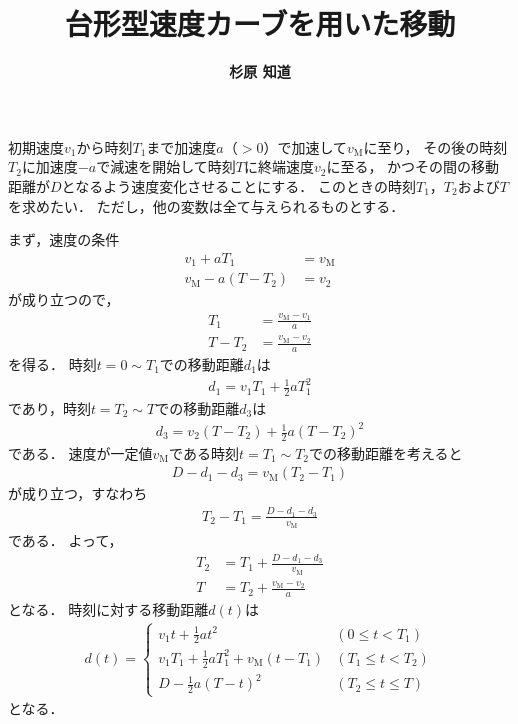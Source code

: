 ﻿\documentclass[a4paper]{jsarticle}
\title{\bf 台形型速度カーブを用いた移動}
\author{\Large{\bf 杉原 知道}}
\date{}
\begin{document}
\maketitle
\vspace{-\baselineskip}

\begin{figure}[th]
\begin{center}

\end{center}
\end{figure}

初期速度$v_{1}$から時刻$T_{1}$まで加速度$a$（$>0$）で加速して$v_{\mathrm{M}}$に至り，
その後の時刻$T_{2}$に加速度$-a$で減速を開始して時刻$T$に終端速度$v_{2}$に至る，
かつその間の移動距離が$D$となるよう速度変化させることにする．
このときの時刻$T_{1}$，$T_{2}$および$T$を求めたい．
ただし，他の変数は全て与えられるものとする．

まず，速度の条件
\begin{align}
v_{1}+aT_{1}&=v_{\mathrm{M}} \\
v_{\mathrm{M}}-a(T-T_{2})&=v_{2}
\end{align}
が成り立つので，
\begin{align}
T_{1}&=\frac{v_{\mathrm{M}}-v_{1}}{a} \\
T-T_{2}&=\frac{v_{\mathrm{M}}-v_{2}}{a}
\end{align}
を得る．
時刻$t=0\sim T_{1}$での移動距離$d_{1}$は
\begin{align}
d_{1}=v_{1}T_{1}+\frac{1}{2}aT_{1}^{2}
\end{align}
であり，時刻$t=T_{2}\sim T$での移動距離$d_{3}$は
\begin{align}
d_{3}=v_{2}(T-T_{2})+\frac{1}{2}a(T-T_{2})^{2}
\end{align}
である．
速度が一定値$v_{\mathrm{M}}$である時刻$t=T_{1}\sim T_{2}$での移動距離を考えると
\begin{align}
D-d_{1}-d_{3}=v_{\mathrm{M}}(T_{2}-T_{1})
\end{align}
が成り立つ，すなわち
\begin{align}
T_{2}-T_{1}=\frac{D-d_{1}-d_{3}}{v_{\mathrm{M}}}
\end{align}
である．
よって，
\begin{align}
T_{2}&=T_{1}+\frac{D-d_{1}-d_{3}}{v_{\mathrm{M}}}
\\
T&=T_{2}+\frac{v_{\mathrm{M}}-v_{2}}{a}
\end{align}
となる．
時刻に対する移動距離$d(t)$は
\begin{align}
d(t)=\begin{cases}
v_{1}t+\frac{1}{2}at^{2} & (0\leq t<T_{1})
\\
v_{1}T_{1}+\frac{1}{2}aT_{1}^{2}+v_{\mathrm{M}}(t-T_{1}) & (T_{1}\leq t<T_{2})
\\
D-\frac{1}{2}a(T-t)^{2} & (T_{2}\leq t\leq T)
\end{cases}
\end{align}
となる．
\end{document}
